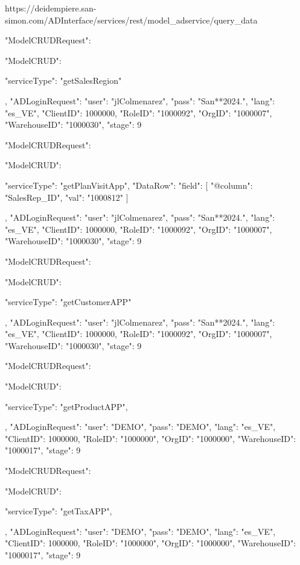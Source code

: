 https://deidempiere.san-simon.com/ADInterface/services/rest/model_adservice/query_data



{
    "ModelCRUDRequest": {
        "ModelCRUD": {
            "serviceType": "getSalesRegion"
           
        },
          "ADLoginRequest": {
            "user": "jlColmenarez",
            "pass": "San**2024.",
            "lang": "es_VE",
            "ClientID": 1000000,
            "RoleID": "1000092",
            "OrgID": "1000007",
            "WarehouseID": "1000030",
            "stage": 9
        }
    }
}

{
    "ModelCRUDRequest": {
        "ModelCRUD": {
            "serviceType": "getPlanVisitApp",
            "DataRow": {
            "field": [
              {
                "@column": "SalesRep_ID",
                "val": "1000812"
              }
            ]
          }
           
        },
          "ADLoginRequest": {
            "user": "jlColmenarez",
            "pass": "San**2024.",
            "lang": "es_VE",
            "ClientID": 1000000,
            "RoleID": "1000092",
            "OrgID": "1000007",
            "WarehouseID": "1000030",
            "stage": 9
        }
    }
}


{
    "ModelCRUDRequest": {
        "ModelCRUD": {
            "serviceType": "getCustomerAPP"
           
        },
          "ADLoginRequest": {
            "user": "jlColmenarez",
            "pass": "San**2024.",
            "lang": "es_VE",
            "ClientID": 1000000,
            "RoleID": "1000092",
            "OrgID": "1000007",
            "WarehouseID": "1000030",
            "stage": 9
        }
    }
}




{
    "ModelCRUDRequest": {
        "ModelCRUD": {
            "serviceType": "getProductAPP",
           
        },
        "ADLoginRequest": {
            "user": "DEMO",
            "pass": "DEMO",
            "lang": "es_VE",
            "ClientID": 1000000,
            "RoleID": "1000000",
            "OrgID": "1000000",
            "WarehouseID": "1000017",
            "stage": 9
        }
    }
}




{
    "ModelCRUDRequest": {
        "ModelCRUD": {
            "serviceType": "getTaxAPP",
           
        },
        "ADLoginRequest": {
            "user": "DEMO",
            "pass": "DEMO",
            "lang": "es_VE",
            "ClientID": 1000000,
            "RoleID": "1000000",
            "OrgID": "1000000",
            "WarehouseID": "1000017",
            "stage": 9
        }
    }
}





